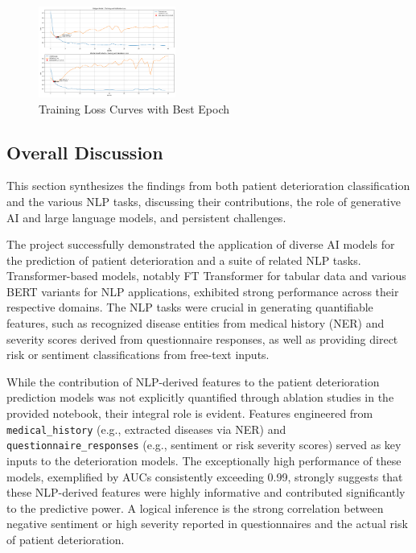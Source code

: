 \begin{figure}[htpb]
    \centering
    \includegraphics[width=0.4\textwidth]{../images/qr_loss_curves_with_best_epoch.png} %
    \caption{Training Loss Curves with Best Epoch}
    \label{fig:qr_loss_curves}
\end{figure}

\subsection{Overall Discussion}

This section synthesizes the findings from both patient deterioration classification and the various NLP tasks, discussing their contributions, the role of generative AI and large language models, and persistent challenges.

The project successfully demonstrated the application of diverse AI models for the prediction of patient deterioration and a suite of related NLP tasks. Transformer-based models, notably FT Transformer for tabular data and various BERT variants for NLP applications, exhibited strong performance across their respective domains. The NLP tasks were crucial in generating quantifiable features, such as recognized disease entities from medical history (NER) and severity scores derived from questionnaire responses, as well as providing direct risk or sentiment classifications from free-text inputs.

While the contribution of NLP-derived features to the patient deterioration prediction models was not explicitly quantified through ablation studies in the provided notebook, their integral role is evident. Features engineered from \texttt{medical\_history} (e.g., extracted diseases via NER) and \texttt{questionnaire\_responses} (e.g., sentiment or risk severity scores) served as key inputs to the deterioration models. The exceptionally high performance of these models, exemplified by AUCs consistently exceeding 0.99, strongly suggests that these NLP-derived features were highly informative and contributed significantly to the predictive power. A logical inference is the strong correlation between negative sentiment or high severity reported in questionnaires and the actual risk of patient deterioration.

